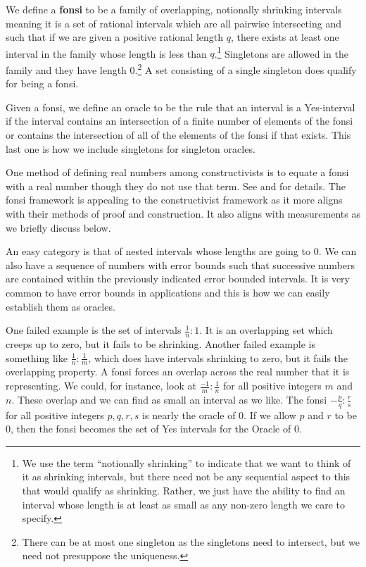\documentclass[12pt]{article}
\begin{document}
We define a \textbf{fonsi} to be a family of overlapping, notionally shrinking intervals meaning it is a set of rational intervals which are all pairwise intersecting and such that if we are given a positive rational length $q$, there exists at least one interval in the family whose length is less than $q$.\footnote{We use the term ``notionally shrinking'' to indicate that we want to think of it as shrinking intervals, but there need not be any sequential aspect to this that would qualify as shrinking. Rather, we just have the ability to find an interval whose length is at least as small as any non-zero length we care to specify.} Singletons are allowed in the family and they have length 0.\footnote{There can be at most one singleton as the singletons need to intersect, but we need not presuppose the uniqueness.} A set consisting of a single singleton does qualify for being a fonsi.

Given a fonsi, we define an oracle to be the rule that an interval is a Yes-interval if the interval contains an intersection of a finite number of elements of the fonsi or contains the intersection of all of the elements of the fonsi if that exists. This last one is how we include singletons for singleton oracles. 

One method of defining real numbers among constructivists is to equate a fonsi with a real number though they do not use that term. See \cite{bridger} and \cite{bridges} for details. The fonsi framework is appealing to the constructivist framework as it more aligns with their methods of proof and construction. It also aligns with measurements as we briefly discuss below. 

An easy category is that of nested intervals whose lengths are going to 0. We can also have a sequence of numbers with error bounds such that successive numbers are contained within the previously indicated error bounded intervals.  It is very common to have error bounds in applications and this is how we can easily establish them as oracles. 

One failed example is the set of intervals $\frac{1}{n}:1$. It is an overlapping set which creeps up to zero, but it fails to be shrinking. Another failed example is something like $\frac{1}{n}:\frac{1}{m}$, which does have intervals shrinking to zero, but it fails the overlapping property. A fonsi forces an overlap across the real number that it is representing. We could, for instance, look at $\frac{-1}{m}:\frac{1}{n}$ for all positive integers $m$ and $n$. These overlap and we can find as small an interval as we like. The fonsi $-\frac{p}{q} : \frac{r}{s}$ for all positive integers $p, q, r, s$ is nearly the oracle of 0. If we allow $p$ and $r$ to be 0, then the fonsi becomes the set of Yes intervals for the Oracle of 0. 
\end{document}
